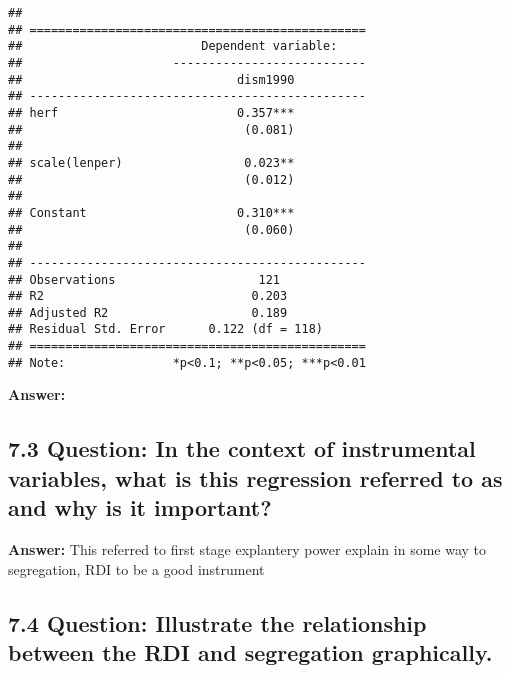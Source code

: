 \documentclass[
]{article}
\begin{document}
\begin{verbatim}
## 
## ===============================================
##                         Dependent variable:    
##                     ---------------------------
##                              dism1990          
## -----------------------------------------------
## herf                         0.357***          
##                               (0.081)          
##                                                
## scale(lenper)                 0.023**          
##                               (0.012)          
##                                                
## Constant                     0.310***          
##                               (0.060)          
##                                                
## -----------------------------------------------
## Observations                    121            
## R2                             0.203           
## Adjusted R2                    0.189           
## Residual Std. Error      0.122 (df = 118)      
## ===============================================
## Note:               *p<0.1; **p<0.05; ***p<0.01
\end{verbatim}

\textbf{Answer:}

\clearpage

\hypertarget{question-in-the-context-of-instrumental-variables-what-is-this-regression-referred-to-as-and-why-is-it-important}{%
\subsection{7.3 Question: In the context of instrumental variables, what
is this regression referred to as and why is it
important?}\label{question-in-the-context-of-instrumental-variables-what-is-this-regression-referred-to-as-and-why-is-it-important}}

\textbf{Answer:} This referred to first stage explantery power explain
in some way to segregation, RDI to be a good instrument

\clearpage

\hypertarget{question-illustrate-the-relationship-between-the-rdi-and-segregation-graphically.}{%
\subsection{7.4 Question: Illustrate the relationship between the RDI
and segregation
graphically.}\label{question-illustrate-the-relationship-between-the-rdi-and-segregation-graphically.}}
\end{document}

